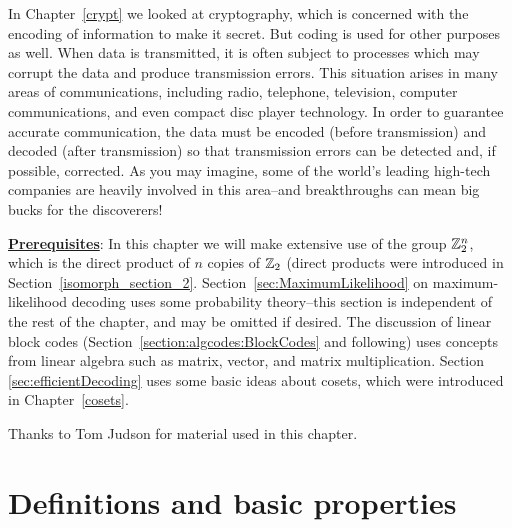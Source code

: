  
In Chapter~\ref{crypt} we looked at  cryptography, which is concerned with the encoding of  information to make it secret. But coding is used for other purposes as well.  When data is transmitted, it is often subject to processes which may corrupt the data and produce transmission errors. This situation
arises in many areas of communications, including radio, telephone, television, computer communications, and even compact disc player technology. In order to guarantee accurate communication, the data must be encoded (before transmission) and decoded (after transmission) so that transmission errors can be detected and, if possible, corrected. As you may imagine,  some of the world's leading high-tech companies are heavily involved in this area--and breakthroughs can mean big bucks for the discoverers!
\medskip

\noindent
\underline{\bf Prerequisites}: In this chapter we will make extensive use of the group ${\Bbb Z}^{n}_{2}$, which is the direct product of $n$ copies of ${\Bbb Z}_{2}$ (direct products were introduced in Section~\ref{isomorph_section_2}.  Section~\ref{sec:MaximumLikelihood} on maximum-likelihood decoding uses some probability theory--this section is independent of the rest of the chapter, and may be omitted if desired. The discussion of linear block codes (Section~\ref{section:algcodes:BlockCodes} and following) uses concepts from linear algebra such as matrix, vector, and matrix multiplication. Section \ref{sec:efficientDecoding} uses some basic ideas about cosets, which were introduced in  Chapter~\ref{cosets}.  
\bigskip

Thanks to Tom Judson for material used in this chapter.
  
 
\section{Definitions and basic properties}\label{section:algcodes:1}
  

